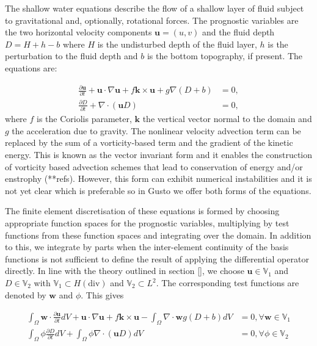 \documentclass[11pt, a4paper]{article}
\def\MM#1{\boldsymbol{#1}}
\begin{document}
The shallow water equations describe the flow of a shallow layer of
fluid subject to gravitational and, optionally, rotational forces. The
prognostic variables are the two horizontal velocity components
$\MM{u} = (u, v)$ and the fluid depth $D = H + h - b$ where $H$ is the
undisturbed depth of the fluid layer, $h$ is the perturbation to the
fluid depth and $b$ is the bottom topography, if present. The
equations are:

\begin{align*}
  \frac{\partial\MM{u}}{\partial t} + \MM{u}\cdot\nabla\MM{u} + f\MM{k}\times\MM{u} + g\nabla (D+b) &= 0, \\
  \frac{\partial D}{\partial t} + \nabla\cdot(\MM{u}D) &= 0,
\end{align*}
where $f$ is the Coriolis parameter, $\MM{k}$ the vertical vector normal
to the domain and $g$ the acceleration due to gravity. The nonlinear velocity
advection term can be replaced by the sum of a vorticity-based term
and the gradient of the kinetic energy. This is known as the vector
invariant form and it enables the construction of vorticity based
advection schemes that lead to conservation of energy and/or enstrophy
(**refs). However, this form can exhibit numerical instabilities and
it is not yet clear which is preferable so in Gusto we offer both
forms of the equations.

The finite element discretisation of these equations is formed by
choosing appropriate function spaces for the prognostic variables,
multiplying by test functions from these function spaces and
integrating over the domain. In addition to this, we integrate by
parts when the inter-element continuity of the basis functions is not
sufficient to define the result of applying the differential operator
directly. In line with the theory outlined in section \ref{}, we
choose $\MM{u} \in \mathbb{V}_1$ and $D \in \mathbb{V}_2$ with
$\mathbb{V}_1 \subset H(\text{div})$ and $\mathbb{V}_2 \subset L^2$. The
corresponding test functions are denoted by $\MM{w}$ and $\phi$. This gives

\begin{align*}
  \int_\Omega\MM{w}\cdot\frac{\partial\MM{u}}{\partial t}dV + \MM{u}\cdot\nabla\MM{u} + f\MM{k}\times\MM{u} - \int_\Omega \nabla\cdot\MM{w} g(D+b) dV &= 0, \forall \MM{w}\in\mathbb{V}_1 \\
  \int_\Omega\phi\frac{\partial D}{\partial t}dV + \int_\Omega\phi\nabla\cdot(\MM{u}D) dV &= 0, \forall \phi\in\mathbb{V}_2
\end{align*}
\end{document}
